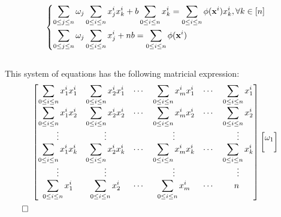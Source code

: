 \documentclass{exam}
\renewenvironment{proof}{{\noindent\itshape\ignorespaces}}{{\hfill$\qed$\\}}
\begin{document}
\begin{proof}
    \begin{equation}
        \left\{
        \begin{aligned}
                \displaystyle\sum_{\tiny 0 \leq j\leq n } \omega_j &\sum_{\tiny 0 \leq i\leq n } x^{i}_{j} x^{i}_{k}  +  b \sum_{\tiny 0 \leq i\leq n }  x^{i}_k = \displaystyle\sum_{\tiny 0 \leq i\leq n }\phi(\bold{x}^{i}) x^{i}_{k}, \forall k \in \left[n\right] \\
                \displaystyle\sum_{\tiny 0 \leq j \leq n }\omega_j &\sum_{\tiny 0 \leq i \leq n }x^{i}_{j} + nb = \displaystyle\sum_{\tiny 0 \leq i\leq n }\phi(\bold{x}^{i})
        \end{aligned}
        \right.
\end{equation}
\\
This system of equations has the following matricial expression:\\
\begin{equation}
        \begin{bmatrix}
            \displaystyle\sum_{\tiny 0 \leq i\leq n } x^{i}_{1} x^{i}_{1} & \displaystyle\sum_{\tiny0 \leq i\leq n } x^{i}_{2} x^{i}_{1} & \cdots & \displaystyle\sum_{\tiny 0 \leq i\leq n } x^{i}_{m} x^{i}_{1} & \cdots &\displaystyle\sum_{\tiny 0 \leq i\leq n }  x^{i}_1\\[1.2em]
            \displaystyle\sum_{\tiny 0 \leq i\leq n } x^{i}_{1} x^{i}_{2} & \displaystyle\sum_{\tiny 0 \leq i\leq n } x^{i}_{2} x^{i}_{2}  & \cdots & \displaystyle\sum_{\tiny 0 \leq i\leq n } x^{i}_{m} x^{i}_{2} & \cdots &\displaystyle\sum_{\tiny 0 \leq i\leq n }  x^{i}_2\\
           \vdots  & \vdots  & \ & \vdots & \ & \vdots \\
           \displaystyle\sum_{\tiny 0 \leq i\leq n } x^{i}_{1} x^{i}_{k}  & \displaystyle\sum_{\tiny 0 \leq i\leq n } x^{i}_{2} x^{i}_{k}  & \cdots & \displaystyle\sum_{\tiny 0 \leq i\leq n } x^{i}_{m} x^{i}_{k} & \cdots &\displaystyle\sum_{\tiny 0 \leq i\leq n }  x^{i}_k\\
           \vdots  & \vdots  & \ & \vdots & \ & \vdots \\
           \displaystyle\sum_{\tiny 0 \leq i\leq n } x^{i}_{1}  & \displaystyle\sum_{\tiny 0 \leq i\leq n } x^{i}_{2} & \cdots & \displaystyle\sum_{\tiny 0 \leq i\leq n } x^{i}_{m}& \cdots & n\
        \end{bmatrix}
        \begin{bmatrix}
            \omega_1 \\[1em]

\end{bmatrix}
\end{equation}
\end{proof}
\end{document}
